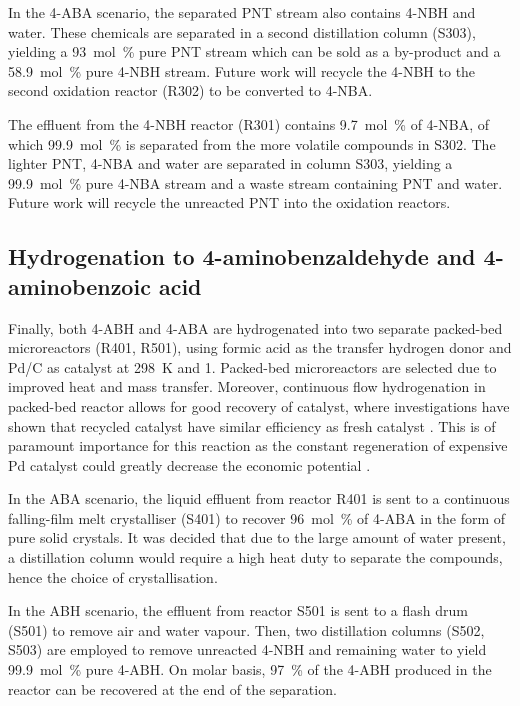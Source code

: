 In the 4-ABA scenario, the separated PNT stream also contains 4-NBH and water. These chemicals are separated in a second distillation column (S303), yielding a \SI{93}{mol\percent} pure PNT stream which can be sold as a by-product and a \SI{58.9}{mol\percent} pure 4-NBH stream. Future work will recycle the 4-NBH to the second oxidation reactor (R302) to be converted to 4-NBA.

The effluent from the 4-NBH reactor (R301) contains \SI{9.7}{mol\percent} of 4-NBA, of which \SI{99.9}{mol\percent} is separated from the more volatile compounds in S302. The lighter PNT, 4-NBA and water are separated in column S303, yielding a \SI{99.9}{mol\percent} pure 4-NBA stream and a waste stream containing PNT and water. Future work will recycle the unreacted PNT into the oxidation reactors.

\subsection{Hydrogenation to 4-aminobenzaldehyde and 4-aminobenzoic acid}

Finally, both 4-ABH and 4-ABA are hydrogenated into two separate packed-bed microreactors (R401, R501), using formic acid as the transfer hydrogen donor and Pd/C as catalyst at \SI{298}{\K} and \SI{1}{\atm}. Packed-bed microreactors are selected due to improved heat and mass transfer. Moreover, continuous flow hydrogenation in packed-bed reactor allows for good recovery of catalyst, where investigations have shown that recycled catalyst have similar efficiency as fresh catalyst \cite{rahman_fast_2020}. This is of paramount importance for this reaction as the constant regeneration of expensive Pd catalyst could greatly decrease the economic potential \cite{rahman_fast_2020}. 


In the ABA scenario, the liquid effluent from reactor R401 is sent to a continuous falling-film melt crystalliser (S401) to recover \SI{96}{mol\percent} of 4-ABA in the form of pure solid crystals. It was decided that due to the large amount of water present, a distillation column would require a high heat duty to separate the compounds, hence the choice of crystallisation. %

 In the ABH scenario, the effluent from reactor S501 is sent to a flash drum (S501) to remove air and water vapour. Then, two distillation columns (S502, S503) are employed to remove unreacted 4-NBH and remaining water to yield  \SI{99.9}{mol\percent} pure 4-ABH. On molar basis, \SI{97}{\percent} of the 4-ABH produced in the reactor can be recovered at the end of the separation.

